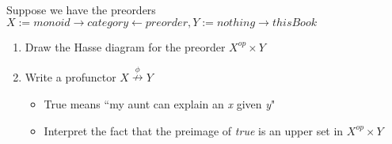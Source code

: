 Suppose we have the preorders $X:=\boxed{monoid\rightarrow category \leftarrow preorder}, Y:=\boxed{nothing \rightarrow thisBook}$
    \begin{enumerate}
      \item Draw the Hasse diagram for the preorder $X^{op} \times Y$
      \item Write a profunctor $X \overset{\phi}\nrightarrow Y$
            \begin{itemize}
              \item True means ``my aunt can explain an \emph{x} given \emph{y}"
              \item Interpret the fact that the preimage of \emph{true} is an upper set in $X^{op}\times Y$
            \end{itemize}
    \end{enumerate}